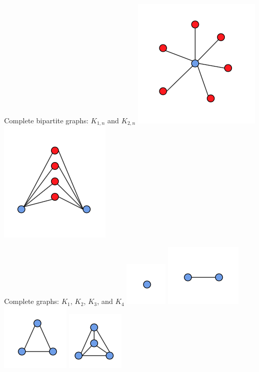 \documentclass[a4paper]{article}
\begin{document}
Complete bipartite graphs: $K_{1,n}$ and $K_{2,n}$
\includegraphics[scale=.5]{k1n.png}
\includegraphics[scale=.5]{k2n.png}

\noindent Complete graphs: $K_1$, $K_2$, $K_3$, and $K_4$
\includegraphics[scale=.6]{k1.png}
\includegraphics[scale=.6]{k2.png}
\includegraphics[scale=.6]{k3.png}
\includegraphics[scale=.6]{k4.png}
\end{document}
